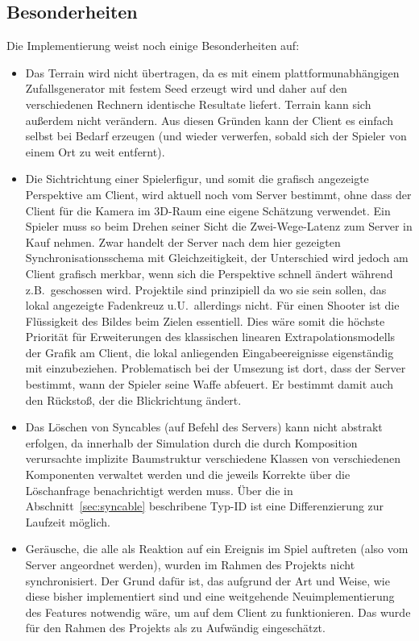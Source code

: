\subsection{Besonderheiten}
Die Implementierung weist noch einige Besonderheiten auf:%
\begin{itemize}
\item Das Terrain wird nicht übertragen, da es mit einem plattformunabhängigen Zufallsgenerator mit festem Seed erzeugt wird und daher auf den verschiedenen Rechnern identische Resultate liefert. Terrain kann sich außerdem nicht verändern. Aus diesen Gründen kann der Client es einfach selbst bei Bedarf erzeugen (und wieder verwerfen, sobald sich der Spieler von einem Ort zu weit entfernt).
\item Die Sichtrichtung einer Spielerfigur, und somit die grafisch angezeigte Perspektive am Client, wird aktuell noch vom Server bestimmt, ohne dass der Client für die Kamera im 3D-Raum eine eigene Schätzung verwendet. 
Ein Spieler muss so beim Drehen seiner Sicht die Zwei-Wege-Latenz zum Server in Kauf nehmen. Zwar handelt der Server nach dem hier gezeigten Synchronisationsschema mit Gleichzeitigkeit, der Unterschied wird jedoch am Client grafisch merkbar, wenn sich die Perspektive schnell ändert während z.B.~geschossen wird. Projektile sind prinzipiell da wo sie sein sollen, das lokal angezeigte Fadenkreuz u.U.~allerdings nicht. Für einen Shooter ist die Flüssigkeit des Bildes  beim Zielen essentiell.
Dies wäre somit die höchste Priorität für Erweiterungen des klassischen linearen Extrapolationsmodells der Grafik am Client, die lokal anliegenden Eingabeereignisse eigenständig mit einzubeziehen. Problematisch bei der Umsezung ist dort, dass der Server bestimmt, wann der Spieler seine Waffe abfeuert. Er bestimmt damit auch den Rückstoß, der die Blickrichtung ändert.
\item Das Löschen von Syncables (auf Befehl des Servers) kann nicht abstrakt erfolgen, da innerhalb der Simulation durch die durch Komposition verursachte implizite Baumstruktur verschiedene Klassen von verschiedenen Komponenten verwaltet werden und die jeweils Korrekte über die Löschanfrage benachrichtigt werden muss. Über die in Abschnitt~\ref{sec:syncable} beschribene Typ-ID ist eine Differenzierung zur Laufzeit möglich.
\item Geräusche, die alle als Reaktion auf ein Ereignis im Spiel auftreten (also vom Server angeordnet werden), wurden im Rahmen des Projekts nicht synchronisiert. Der Grund dafür ist, das aufgrund der Art und Weise, wie diese bisher implementiert sind und eine weitgehende Neuimplementierung des Features notwendig wäre, um auf dem Client zu funktionieren. Das wurde für den Rahmen des Projekts als zu Aufwändig eingeschätzt.

\end{itemize}
